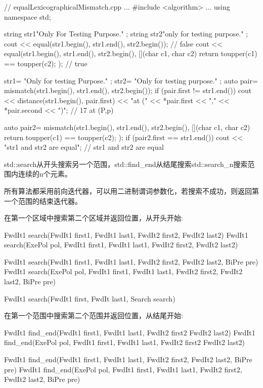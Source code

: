 \begin{cpp}
// equalLexicographicalMismatch.cpp
...
#include <algorithm>
...
using namespace std;

string str1{"Only For Testing Purpose." };
string str2{"only for testing purpose." };
cout << equal(str1.begin(), str1.end(), str2.begin()); // false
cout << equal(str1.begin(), str1.end(), str2.begin(),
			  [](char c1, char c2){ return toupper(c1) == toupper(c2);} );
																// true

str1= {"Only for testing Purpose." };
str2= {"Only for testing purpose." };
auto pair= mismatch(str1.begin(), str1.end(), str2.begin());
if (pair.first != str1.end()){
	cout << distance(str1.begin(), pair.first)
		 << "at (" << *pair.first << "," << *pair.second << ")"; // 17 at (P,p)
}

auto pair2= mismatch(str1.begin(), str1.end(), str2.begin(),
					 [](char c1, char c2){ return toupper(c1) == toupper(c2); });
if (pair2.first == str1.end()){
	cout << "str1 and str2 are equal"; // str1 and str2 are equal
}
\end{cpp}


std::search从开头搜索另一个范围，std::find\_end从结尾搜索std::search\_n搜索范围内连续的n个元素。

所有算法都采用前向迭代器，可以用二进制谓词参数化，若搜索不成功，则返回第一个范围的结束迭代器。

在第一个区域中搜索第二个区域并返回位置，从开头开始:

\begin{cpp}
FwdIt1 search(FwdIt1 first1, FwdIt1 last1, FwdIt2 first2, FwdIt2 last2)
FwdIt1 search(ExePol pol, FwdIt1 first1, FwdIt1 last1,
			  FwdIt2 first2, FwdIt2 last2)
			  
FwdIt1 search(FwdIt1 first1, FwdIt1 last1,
			  FwdIt2 first2, FwdIt2 last2, BiPre pre)
FwdIt1 search(ExePol pol, FwdIt1 first1, FwdIt1 last1,
			  FwdIt2 first2, FwdIt2 last2, BiPre pre)
			  
FwdIt1 search(FwdIt1 first, FwdIt last1, Search search)
\end{cpp}

在第一个范围中搜索第二个范围并返回位置，从结尾开始:

\begin{cpp}
FwdIt1 find_end(FwdIt1 first1, FwdIt1 last1, FwdIt2 first2 FwdIt2 last2)
FwdIt1 find_end(ExePol pol, FwdIt1 first1, FwdIt1 last1,
				FwdIt2 first2 FwdIt2 last2)
				
FwdIt1 find_end(FwdIt1 first1, FwdIt1 last1, FwdIt2 first2, FwdIt2 last2,
				BiPre pre)
FwdIt1 find_end(ExePol pol, FwdIt1 first1, FwdIt1 last1,
				FwdIt2 first2, FwdIt2 last2, BiPre pre)
\end{cpp}

